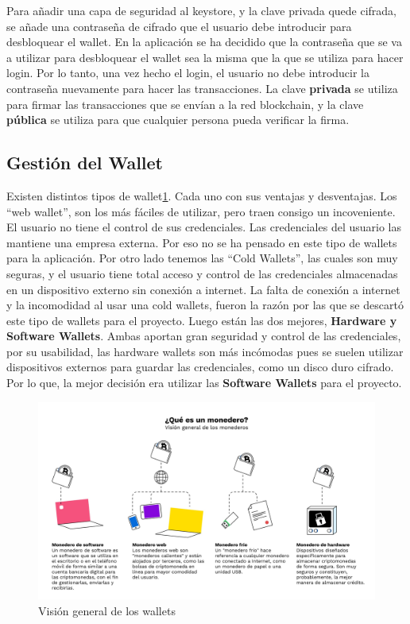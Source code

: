 Para añadir una capa de seguridad al keystore, y la clave privada quede cifrada, se añade una contraseña de cifrado que el usuario debe introducir para desbloquear el wallet. En la aplicación se ha decidido que la contraseña que se va a utilizar para desbloquear el wallet sea la misma que la que se utiliza para hacer login. Por lo tanto, una vez hecho el login, el usuario no debe introducir la contraseña nuevamente para hacer las transacciones. La clave \textbf{privada} se utiliza para firmar las transacciones que se envían a la red blockchain, y la clave \textbf{pública} se utiliza para que cualquier persona pueda verificar la firma. \\

\subsection{Gestión del Wallet}

Existen distintos tipos de wallet\ref{fig:tipos_wallet}. Cada uno con sus ventajas y desventajas. Los ``web wallet'', son los más fáciles de utilizar, pero traen consigo un incoveniente. El usuario no tiene el control de sus credenciales. Las credenciales del usuario las mantiene una empresa externa. Por eso no se ha pensado en este tipo de wallets para la aplicación. Por otro lado tenemos las ``Cold Wallets'', las cuales son muy seguras, y el usuario tiene total acceso y control de las credenciales almacenadas en un dispositivo externo sin conexión a internet. La falta de conexión a internet y la incomodidad al usar una cold wallets, fueron la razón por las que se descartó este tipo de wallets para el proyecto. Luego están las dos mejores, \textbf{Hardware y Software Wallets}. Ambas aportan gran seguridad y control de las credenciales, por su usabilidad, las hardware wallets son más incómodas pues se suelen utilizar dispositivos externos para guardar las credenciales, como un disco duro cifrado. Por lo que, la mejor decisión era utilizar las \textbf{Software Wallets} para el proyecto. \\

\begin{figure}[h!]
  \centering
  \includegraphics[width=0.8\linewidth]{figs/Desarrollo/Wallet/que_es_wallet}
  \caption[Visión general de los wallets]{Visión general de los wallets}
  \label{fig:tipos_wallet}
\end{figure}

